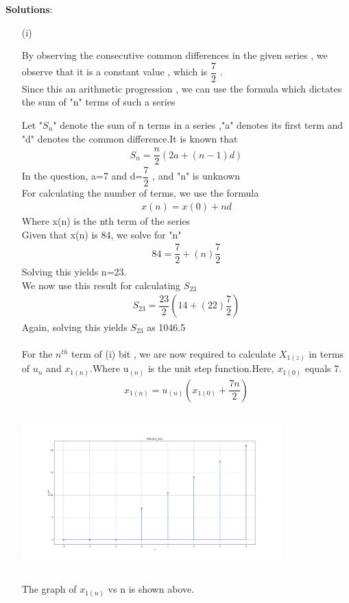\documentclass[journal,12pt,twocolumn]{IEEEtran}
\theoremstyle{remark}
\begin{document}
\vspace{0.5cm}
\textbf{Solutions}:
\begin{enumerate}
\item[(i)]   

By observing the consecutive common differences in the given series , we observe that it is a constant value , which is $\dfrac{7}{2}$ .\\
Since this an arithmetic progression , we can use the formula which dictates the sum of "n" terms of such a series

Let "$S_n$" denote the sum of n terms in a series ,"a" denotes its first term and "d" denotes the common difference.It is known that
\begin{align}
{S_n} = \dfrac{n}{2}(2a + (n-1)d)\label{eq:1}
\end{align}
In the question, a=7 and d=$\dfrac{7}{2}$ , and "n" is unknown\\
For calculating the number of terms, we use the formula
\begin{align}
x(n) = x(0) + nd\label{eq:2}
\end{align}
Where x(n) is the nth term of the series\\
Given that x(n) is 84, we solve for "n"
\begin{align}  
84 = \dfrac{7}{2}+(n)\dfrac{7}{2}
\end{align}
Solving this yields n=23.\\
We now use this result for calculating $S_{23}$
\begin{align}
    S_{23} = \dfrac{23}{2}(14+(22)\dfrac{7}{2})
    \end{align}
Again, solving this yields $S_{23}$ as 1046.5\\\\
For the $n^{th}$ term of (i) bit , we are now required to calculate $X_{1(z)}$ in terms of $u_n$ and $x_{1(n)}$.Where u$_{(n)}$ is the unit step function.Here, $x_{1(0)}$ equals 7.\\
\begin{align}
    x_{1(n)} = u_{(n)}(x_{1(0)}+\dfrac{7n}{2})
    \end{align}
\graphicspath{ {figs/} }
\includegraphics[width=10cm, height=6cm]{graph_1}
\caption{The graph of $x_{1(n)}$ vs n is shown above.}\\
\label{graph:1}


\end{enumerate}
\end{document}
